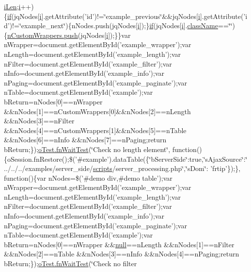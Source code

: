 \begin{DoxyCompactItemize}
\hyperlink{core_8constructor_8js_abfee48f894bf5beb8750699f5f8621e6}{i\+Len};\hyperlink{validate_8js_a5e25b1d1bed9ab5f3174b76d6a722180}{i}++)\{\hyperlink{fullpage_2plugin_8js_a8b98017e64ef036adb9ae327ff94abe1}{if}(jq\+Nodes\mbox{[}\hyperlink{validate_8js_a5e25b1d1bed9ab5f3174b76d6a722180}{i}\mbox{]}.get\+Attribute('id')!=\char`\"{}example\+\_\+previous\char`\"{}\&\&jq\+Nodes\mbox{[}\hyperlink{validate_8js_a5e25b1d1bed9ab5f3174b76d6a722180}{i}\mbox{]}.get\+Attribute('id')!=\char`\"{}example\+\_\+next\char`\"{})\{n\+Nodes.\+push(jq\+Nodes\mbox{[}\hyperlink{validate_8js_a5e25b1d1bed9ab5f3174b76d6a722180}{i}\mbox{]});\}\hyperlink{fullpage_2plugin_8js_a8b98017e64ef036adb9ae327ff94abe1}{if}(jq\+Nodes\mbox{[}\hyperlink{validate_8js_a5e25b1d1bed9ab5f3174b76d6a722180}{i}\mbox{]}.\hyperlink{validate_8js_abbe788cfd8330266bd93d69ea395d1d0}{class\+Name}==\char`\"{}\char`\"{})\{\hyperlink{core_8constructor_8js_afa3ccdb0f651abf66d93864fc8419c98}{n\+Custom\+Wrappers.\+push}(jq\+Nodes\mbox{[}\hyperlink{validate_8js_a5e25b1d1bed9ab5f3174b76d6a722180}{i}\mbox{]});\}\}var n\+Wrapper=document.\+get\+Element\+By\+Id('example\+\_\+wrapper');var n\+Length=document.\+get\+Element\+By\+Id('example\+\_\+length');var n\+Filter=document.\+get\+Element\+By\+Id('example\+\_\+filter');var n\+Info=document.\+get\+Element\+By\+Id('example\+\_\+info');var n\+Paging=document.\+get\+Element\+By\+Id('example\+\_\+paginate');var n\+Table=document.\+get\+Element\+By\+Id('example');var b\+Return=n\+Nodes\mbox{[}0\mbox{]}==n\+Wrapper \&\&n\+Nodes\mbox{[}1\mbox{]}==n\+Custom\+Wrappers\mbox{[}0\mbox{]}\&\&n\+Nodes\mbox{[}2\mbox{]}==n\+Length \&\&n\+Nodes\mbox{[}3\mbox{]}==n\+Filter \&\&n\+Nodes\mbox{[}4\mbox{]}==n\+Custom\+Wrappers\mbox{[}1\mbox{]}\&\&n\+Nodes\mbox{[}5\mbox{]}==n\+Table \&\&n\+Nodes\mbox{[}6\mbox{]}==n\+Info \&\&n\+Nodes\mbox{[}7\mbox{]}==n\+Paging;return b\+Return;\});\hyperlink{onhold_24__server-side_2__zero__config_8js_ab25c4d596771c0133cdc45178ce72c3d}{o\+Test.\+fn\+Wait\+Test}(\char`\"{}Check no length element\char`\"{}, function()\{o\+Session.\+fn\+Restore();\$('\#example').data\+Table(\{\char`\"{}b\+Server\+Side\char`\"{}\+:true,\char`\"{}s\+Ajax\+Source\char`\"{}\+:\char`\"{}../../../examples/server\+\_\+side/\hyperlink{tinymce_8jquery_8dev_8js_a09066d4d580eeec222f858d588b4cdef}{scripts}/server\+\_\+processing.\+php\char`\"{},\char`\"{}s\+Dom\char`\"{}\+: 'frtip'\});\}, function()\{var n\+Nodes=\$('\#demo div,\#demo table');var n\+Wrapper=document.\+get\+Element\+By\+Id('example\+\_\+wrapper');var n\+Length=document.\+get\+Element\+By\+Id('example\+\_\+length');var n\+Filter=document.\+get\+Element\+By\+Id('example\+\_\+filter');var n\+Info=document.\+get\+Element\+By\+Id('example\+\_\+info');var n\+Paging=document.\+get\+Element\+By\+Id('example\+\_\+paginate');var n\+Table=document.\+get\+Element\+By\+Id('example');var b\+Return=n\+Nodes\mbox{[}0\mbox{]}==n\+Wrapper \&\&\hyperlink{validate_8js_afb8e110345c45e74478894341ab6b28e}{null}==n\+Length \&\&n\+Nodes\mbox{[}1\mbox{]}==n\+Filter \&\&n\+Nodes\mbox{[}2\mbox{]}==n\+Table \&\&n\+Nodes\mbox{[}3\mbox{]}==n\+Info \&\&n\+Nodes\mbox{[}4\mbox{]}==n\+Paging;return b\+Return;\});\hyperlink{onhold_24__server-side_2__zero__config_8js_ab25c4d596771c0133cdc45178ce72c3d}{o\+Test.\+fn\+Wait\+Test}(\char`\"{}Check no filter 
\end{DoxyCompactItemize}
